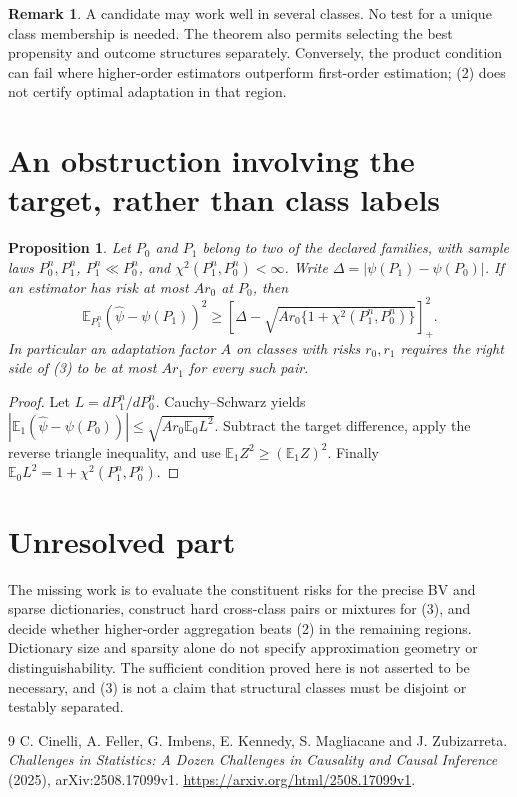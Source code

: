 \documentclass[11pt]{article}
\newtheorem{proposition}[theorem]{Proposition}
\theoremstyle{definition}
\newtheorem{remark}[theorem]{Remark}
\begin{document}
\begin{remark}
A candidate may work well in several classes. No test for a unique class
membership is needed. The theorem also permits selecting the best propensity
and outcome structures separately. Conversely, the product condition can
fail where higher-order estimators outperform first-order estimation;
(2) does not certify optimal adaptation in that region.
\end{remark}

\section*{An obstruction involving the target, rather than class labels}
\begin{proposition}
Let $P_0$ and $P_1$ belong to two of the declared families, with sample laws
$P_0^n,P_1^n$, $P_1^n\ll P_0^n$, and
$\chi^2(P_1^n,P_0^n)<\infty$. Write $\Delta=|\psi(P_1)-\psi(P_0)|$.
If an estimator has risk at most $A r_0$ at $P_0$, then
\[
 \mathbb E_{P_1^n}(\widehat\psi-\psi(P_1))^2
 \ge\left[\Delta-\sqrt{A r_0\{1+\chi^2(P_1^n,P_0^n)\}}\right]_+^2. \tag{3}
\]
In particular an adaptation factor $A$ on classes with risks $r_0,r_1$
requires the right side of (3) to be at most $A r_1$ for every such pair.
\end{proposition}
\begin{proof}
Let $L=dP_1^n/dP_0^n$. Cauchy--Schwarz yields
$|\mathbb E_1(\widehat\psi-\psi(P_0))|
\le\sqrt{A r_0\mathbb E_0L^2}$. Subtract the target difference,
apply the reverse triangle inequality, and use
$\mathbb E_1 Z^2\ge(\mathbb E_1Z)^2$. Finally
$\mathbb E_0L^2=1+\chi^2(P_1^n,P_0^n)$.
\end{proof}

\section*{Unresolved part}
The missing work is to evaluate the constituent risks for the precise BV and
sparse dictionaries, construct hard cross-class pairs or mixtures for (3),
and decide whether higher-order aggregation beats (2) in the remaining
regions. Dictionary size and sparsity alone do not specify approximation
geometry or distinguishability. The sufficient condition proved here is
not asserted to be necessary, and (3) is not a claim that structural classes
must be disjoint or testably separated.

\begin{thebibliography}{9}
 C. Cinelli, A. Feller, G. Imbens, E. Kennedy, S. Magliacane and J. Zubizarreta.
\emph{Challenges in Statistics: A Dozen Challenges in Causality and Causal Inference} (2025), arXiv:2508.17099v1.
\url{https://arxiv.org/html/2508.17099v1}.
\end{thebibliography}
\end{document}
